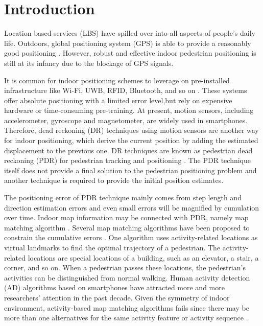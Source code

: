 \documentclass{llncs}
\begin{document}
\section{Introduction}
%
Location based services (LBS) have spilled over into all aspects of people's daily life. Outdoors, global positioning system (GPS) is able to provide a reasonably good positioning \cite{zampella2015indoor}. However, robust and effective indoor pedestrian positioning is still at its infancy due to the blockage of GPS signals. 

It is common for indoor positioning schemes to leverage on pre-installed infrastructure like Wi-Fi, UWB, RFID, Bluetooth, and so on \cite{bahl2000enhancements,ni2004landmarc}. These systems offer absolute positioning with a limited error level,but rely on expensive hardware or time-consuming pre-training. At present, motion sensors, including accelerometer, gyroscope and magnetometer, are widely used in smartphones. Therefore, dead reckoning (DR) techniques using motion sensors are another way for indoor positioning, which derive the current position by adding the estimated displacement to the previous one. DR techniques are known as  pedestrian dead reckoning (PDR) for pedestrian tracking and positioning \cite{zhou2015activity,zhou2015alimc}. The PDR technique itself does not provide a final solution to the pedestrian positioning problem and another technique is required to provide the initial position estimates.

The positioning error of PDR technique mainly comes from step length and direction estimation errors and even small errors will be magnified by cumulation over time. Indoor map information may be connected with PDR, namely map matching algorithm \cite{aly2015semmatch}. Several map matching algorithms have been proposed to constrain the cumulative errors \cite{zampella2015indoor,zhou2015activity,abdelnasser2016semanticslam,fu2017crowdsourcing}.  One algorithm uses activity-related locations as virtual landmarks to find the optimal trajectory of a pedestrian. The activity-related locations are special locations of a building, such as an elevator, a stair, a corner, and so on. When a pedestrian passes these locations, the pedestrian's activities can be distinguished from normal walking. Human activity detection (AD) algorithms based on smartphones have attracted more and more researchers' attention in the past decade. Given the symmetry of indoor environment, activity-based map matching algorithms fails since there may be more than one alternatives for the same activity feature or activity sequence \cite{zhou2015activity}.
\end{document}
